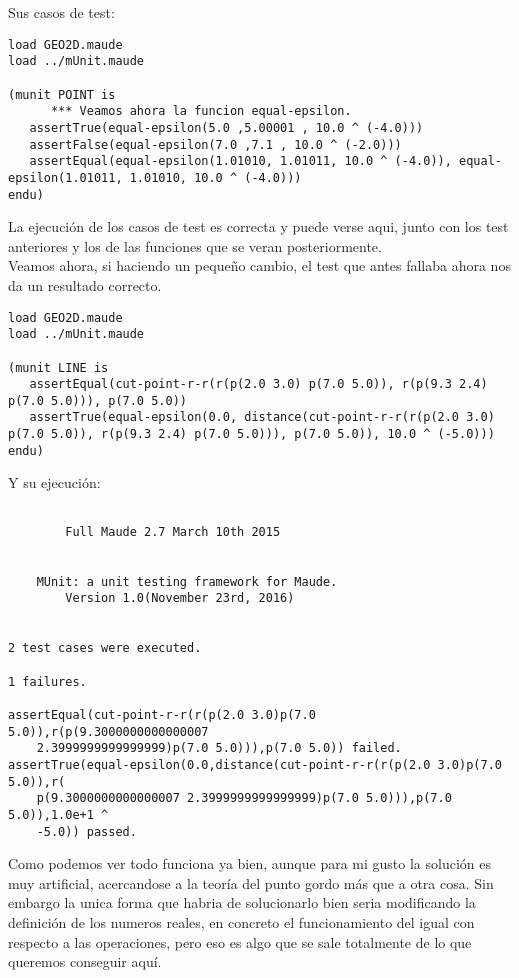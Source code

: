 \documentclass[12pt,a4paper]{book}
\begin{document}
Sus casos de test:

\begin{verbatim}
load GEO2D.maude
load ../mUnit.maude

(munit POINT is
      *** Veamos ahora la funcion equal-epsilon.
   assertTrue(equal-epsilon(5.0 ,5.00001 , 10.0 ^ (-4.0)))
   assertFalse(equal-epsilon(7.0 ,7.1 , 10.0 ^ (-2.0)))
   assertEqual(equal-epsilon(1.01010, 1.01011, 10.0 ^ (-4.0)), equal-epsilon(1.01011, 1.01010, 10.0 ^ (-4.0)))
endu)

\end{verbatim}

La ejecuci\'on de los casos de test es correcta y puede verse aqui, junto con los test anteriores y los de las funciones que se veran posteriormente. \\

Veamos ahora, si haciendo un pequeño cambio, el test que antes fallaba ahora nos da un resultado correcto.

\begin{verbatim}
load GEO2D.maude
load ../mUnit.maude

(munit LINE is
   assertEqual(cut-point-r-r(r(p(2.0 3.0) p(7.0 5.0)), r(p(9.3 2.4) p(7.0 5.0))), p(7.0 5.0))
   assertTrue(equal-epsilon(0.0, distance(cut-point-r-r(r(p(2.0 3.0) p(7.0 5.0)), r(p(9.3 2.4) p(7.0 5.0))), p(7.0 5.0)), 10.0 ^ (-5.0)))
endu)
\end{verbatim} 

Y su ejecuci\'on:

\begin{verbatim}

	    Full Maude 2.7 March 10th 2015


	MUnit: a unit testing framework for Maude.
		Version 1.0(November 23rd, 2016)


2 test cases were executed.

1 failures.

assertEqual(cut-point-r-r(r(p(2.0 3.0)p(7.0 5.0)),r(p(9.3000000000000007
    2.3999999999999999)p(7.0 5.0))),p(7.0 5.0)) failed.
assertTrue(equal-epsilon(0.0,distance(cut-point-r-r(r(p(2.0 3.0)p(7.0 5.0)),r(
    p(9.3000000000000007 2.3999999999999999)p(7.0 5.0))),p(7.0 5.0)),1.0e+1 ^
    -5.0)) passed.

\end{verbatim} 

Como podemos ver todo funciona ya bien, aunque para mi gusto la soluci\'on es muy artificial, acercandose a la teor\'ia del punto gordo m\'as que a otra cosa. Sin embargo la unica forma que habria de solucionarlo bien seria modificando la definici\'on de los numeros reales, en concreto el funcionamiento del igual con respecto a las operaciones, pero eso es algo que se sale totalmente de lo que queremos conseguir aqu\'i. \par
\end{document}

